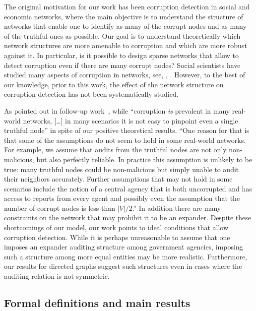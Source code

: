 \documentclass{toc}
\begin{document}
The original motivation for our work has been 
corruption detection in social and economic networks,
where the main objective is to understand the
structure of networks that enable one to identify as many of the corrupt
nodes and as many of the truthful ones as possible. 
%
%
%
%
%
%
%
Our goal is to understand theoretically 
which network structures are more amenable to corruption and which are
more robust against it. In particular, is it possible to design sparse 
networks that allow to detect corruption even if there are many corrupt nodes? 
Social scientists have studied many 
%
aspects of corruption in networks, %
see, \eg, %
\cite{nielsen2003corruption,rock2004comparative,fjeldstad2003fighting}.
However, to the best of our knowledge, prior to this
%
%
%
%
work, the effect of the network structure on corruption detection %
has not been systematically studied.     %

As pointed out in
%
follow-up    %
work~\cite{JiMoRa:18}, while 
%
%
%
%
%
%
%
%
``corruption \emph{is} prevalent in many real-world networks, 
%
[\dots]    %
in many scenarios it is not easy to pinpoint even a single 
truthful node'' in spite of our positive theoretical results.
``One reason for that is that some of the 
assumptions do not seem to hold in some 
%
real-world     %
networks. For example, we assume that audits from the truthful nodes are not only non-malicious, but also perfectly reliable. In practice this assumption is unlikely to be true: many truthful nodes could be non-malicious but simply unable to audit their neighbors accurately. Further assumptions that may not hold in some scenarios include the notion of a central agency that is both uncorrupted and has access to reports from every
%
agent      %
and possibly even the assumption that the number of corrupt nodes is less than $|V| / 2$.'' 
In addition there are many constraints on the network that may prohibit it to be an expander. 
Despite these shortcomings of our model, our work points to ideal conditions that allow corruption detection. 
While it is perhaps unreasonable to assume that one imposes an expander auditing structure among government agencies, imposing such a structure 
among more equal entities
%
%
may be more realistic. Furthermore, our results for directed graphs suggest
such structures even in cases where the auditing relation is not symmetric.  


\subsection{Formal definitions and main results} 
\end{document}
